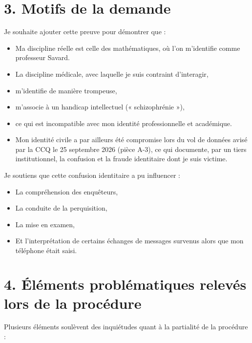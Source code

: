 \documentclass[12pt,a4paper]{article}
\begin{document}
\section*{3. Motifs de la demande}
Je souhaite ajouter cette preuve pour démontrer que :

\begin{itemize}
  \item Ma discipline réelle est celle des mathématiques, où l’on m’identifie comme professeur Savard.
  \item La discipline médicale, avec laquelle je suis contraint d’interagir,
  \item m’identifie de manière trompeuse,
  \item m’associe à un handicap intellectuel (« schizophrénie »),
  \item ce qui est incompatible avec mon identité professionnelle et académique.
  \item Mon identité civile a par ailleurs été compromise lors du vol de données avisé par la CCQ le 25 septembre 2026 (pièce A-3), ce qui documente, par un tiers institutionnel, la confusion et la fraude identitaire dont je suis victime.
\end{itemize}

Je soutiens que cette confusion identitaire a pu influencer :

\begin{itemize}
  \item La compréhension des enquêteurs,
  \item La conduite de la perquisition,
  \item La mise en examen,
  \item Et l’interprétation de certains échanges de messages survenus alors que mon téléphone était saisi.
\end{itemize}

\section*{4. Éléments problématiques relevés lors de la procédure}
Plusieurs éléments soulèvent des inquiétudes quant à la partialité de la procédure :
\end{document}
